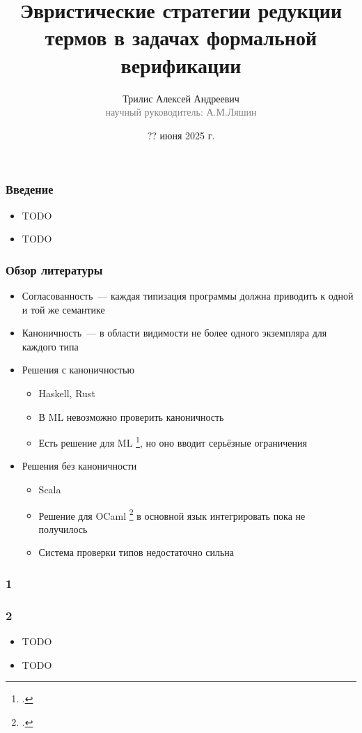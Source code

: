 \documentclass{beamer}
\begin{document}
\title[Стратегии редукции термов]{Эвристические стратегии редукции термов в задачах формальной верификации}
\author[Трилис А.А.]{Трилис Алексей Андреевич\\{\footnotesize\textcolor{gray}{научный руководитель: А.М.Ляшин}}}
\date{?? июня 2025 г.}
\frame{\titlepage}

\begin{frame}\frametitle{Введение}
\begin{itemize}
  \item TODO
  \item TODO
\end{itemize}
\end{frame}

\lstset{language=haskell}
\begin{frame}\frametitle{Обзор литературы}
\begin{itemize}
  \item Согласованность~--- каждая типизация программы должна приводить к одной и той же семантике
  \item Каноничность~--- в области видимости не более одного экземпляра для каждого типа 
  \item Решения с каноничностью
  \begin{itemize}
    \item Haskell, Rust
    \item В ML невозможно проверить каноничность
    \item Есть решение для ML \footcite{ml_typeclasses}, но оно вводит серьёзные ограничения
  \end{itemize}
  \item Решения без каноничности
  \begin{itemize}
    \item Scala
    \item Решение для OCaml \footcite{white} в основной язык интегрировать пока не получилось
    \item Система проверки типов недостаточно сильна
  \end{itemize}
\end{itemize}
\end{frame}

\begin{frame}\frametitle{1}
\end{frame}

\begin{frame}\frametitle{2}
\begin{itemize}
  \item TODO
  \item TODO
\end{itemize}
\end{frame}
\end{document}

